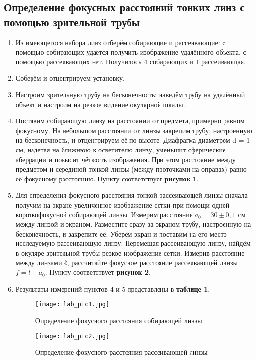 \documentclass[a4paper,12pt]{article} %
\begin{document}
\subsection{Определение фокусных расстояний тонких линз с помощью зрительной трубы}
\begin{enumerate}
    \item Из имеющегося набора линз отберём собирающие и рассеивающие: с помощью собирающих удаётся получить изображение удалённого объекта, с помощью рассеивающих нет. Получилось 4 собирающих и 1 рассеивающая.
    \item Соберём и отцентрируем установку.
    \item Настроим зрительную трубу на бесконечность: наведём трубу на удалённый объект и настроим на резкое видение окулярной шкалы.
    \item  Поставим собирающую линзу на расстоянии от предмета, примерно равном фокусному. На небольшом расстоянии от линзы закрепим трубу, настроенную на бесконечность, и отцентрируем её по высоте. Диафрагма диаметром d = 1 см, надетая на ближнюю к осветителю линзу, уменьшит сферические аберрации и повысит чёткость изображения. При этом расстояние между предметом и серединой тонкой линзы (между проточками на оправах) равно её фокусному расстоянию. Пункту соответствует \textbf{рисунок 1}.
    \item Для определения фокусного расстояния тонкой рассеивающей линзы сначала получим на экране увеличенное изображение сетки при помощи одной короткофокусной собирающей линзы. Измерим расстояние $a_{0} = 30 \pm 0,1$ см между линзой и экраном. Разместите сразу за экраном трубу, настроенную на бесконечность, и
закрепите её. Уберём экран и поставим на его место исследуемую рассеивающую линзу. Перемещая рассеивающую линзу, найдём в окуляре зрительной трубы резкое изображение сетки. Измерив расстояние между линзами ℓ, рассчитайте фокусное расстояние рассеивающей линзы $f = l - a_{0}$. Пункту соответствует \textbf{рисунок 2}.

\item Результаты измерений пунктов 4 и 5 представлены в \textbf{таблице 1}.
	\begin{figure}[h]
 \centering
 \texttt{[image: lab\_pic1.jpg]}
		\caption{Определение фокусного расстояния собирающей линзы}
		
	\end{figure}
 	\begin{figure}[h]
 \centering
 \texttt{[image: lab\_pic2.jpg]}
		\caption{Определение фокусного расстояния рассеивающей линзы}
		
	\end{figure}
\end{enumerate}
\end{document}
